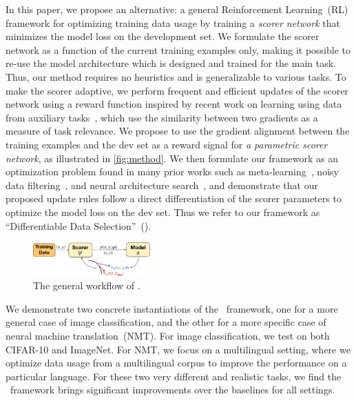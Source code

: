 In this paper, we propose an alternative: a general Reinforcement Learning~(RL) framework for optimizing training data usage by training a \emph{scorer network} that minimizes the model loss on the development set.
We formulate the scorer network as a function of the current training examples only,
making it possible to re-use the model architecture which is designed and trained for the main task. Thus, our method requires no heuristics and is generalizable to various tasks. To make the scorer adaptive, we perform frequent and efficient updates of the scorer network using a reward function inspired by recent work on learning using data from auxiliary tasks~\citep{cos_sim,meta_aux_learn}, which use the similarity between two gradients as a measure of task relevance.
We propose to use the gradient alignment between the training examples and the dev set as a reward signal for \emph{a parametric scorer network}, as illustrated in \autoref{fig:method}. We then formulate our framework as an optimization problem found in many prior works such as meta-learning~\citep{finn2017model}, noisy data filtering~\citep{learn_reweight}, and neural architecture search~\citep{darts}, and demonstrate that our proposed update rules follow a direct differentiation of the scorer parameters to optimize the model loss on the dev set.
Thus we refer to our framework as ``Differentiable Data Selection''~(\dds).

\begin{figure}
    \centering
    \includegraphics[width=0.4\textwidth]{figs/method_plot_crop.pdf}
    \caption{The general workflow of \dds.}
    \label{fig:method}
\end{figure}

We demonstrate two concrete instantiations of the \dds~framework, one for a more general case of image classification, and the other for a more specific case of neural machine translation~(NMT). For image classification, we test on both CIFAR-10 and ImageNet. For NMT, we focus on a multilingual setting, where we optimize data usage from a multilingual corpus to improve the performance on a particular language. %
For these two very different and realistic tasks, we find the \dds~framework brings significant improvements over the baselines for all settings.